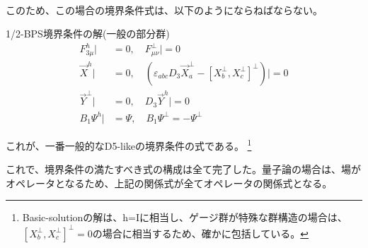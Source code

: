 \documentclass[dvipdfmx,a4paper,10.5pt]{article}
\numberwithin{equation}{section}
\begin{document}
\begin{enumerate}
\begin{align*}
    \end{align*}
    このため、この場合の境界条件式は、以下のようにならねばならない。
    \begin{resultbox}{1/2-BPS境界条件の解(一般の部分群)}
        \begin{equation}
\begin{split}
     F_{3\mu}^{h}|&=0,\quad
    F_{\mu\nu}^{\perp}|=0\\
    \vec{X}^{h}|&=0,\quad
    (\varepsilon_{abc}D_{3}\vec{X}_{a}^{\perp}-[X_{b}^{\perp},X_{c}^{\perp}]^{\perp})|=0\\
    \vec{Y}^{\perp}|&=0,\quad
    D_{3}\vec{Y}^{h}|=0\\
    B_{1}\Psi^{h}|&=\Psi,\quad B_{1}\Psi^{\perp}=-\Psi^{\perp}
\end{split}
\end{equation}
    \end{resultbox}
これが、一番一般的なD5-likeの境界条件の式である。
\footnote{Basic-solutionの解は、h=Iに相当し、ゲージ群が特殊な群構造の場合は、$[X_{b}^{\perp},X_{c}^{\perp}]^{\perp}=0$の場合に相当するため、確かに包括している。}\\
\end{enumerate}

これで、境界条件の満たすべき式の構成は全て完了した。量子論の場合は、場がオペレータとなるため、上記の関係式が全てオペレータの関係式となる。
\end{document}
